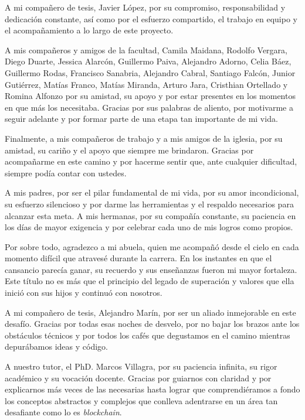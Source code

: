 A mi compañero de tesis, Javier López, por su compromiso, responsabilidad y dedicación constante,
así como por el esfuerzo compartido, el trabajo en equipo y el acompañamiento a lo largo de este
proyecto.

A mis compañeros y amigos de la facultad, Camila Maidana, Rodolfo Vergara, Diego Duarte, Jessica
Alarcón, Guillermo Paiva, Alejandro Adorno, Celia Báez, Guillermo Rodas, Francisco Sanabria, Alejandro Cabral,
Santiago Falcón, Junior Gutiérrez, Matías Franco, Matías Miranda, Arturo Jara, Cristhian Ortellado y
Romina Alfonzo por su amistad, su apoyo y por estar presentes en los momentos en que más los necesitaba.
Gracias por sus palabras de aliento, por motivarme a seguir adelante y por formar parte de una etapa tan importante de mi vida.

Finalmente, a mis compañeros de trabajo y a mis amigos de la iglesia, por su amistad, su cariño y
el apoyo que siempre me brindaron. Gracias por acompañarme en este camino y por hacerme sentir
que, ante cualquier dificultad, siempre podía contar con ustedes.

\vspace{0.3cm}


\clearpage

\vspace*{1cm}

A mis padres, por ser el pilar fundamental de mi vida, por su amor incondicional, su esfuerzo
silencioso y por darme las herramientas y el respaldo necesarios para alcanzar esta meta. A mis
hermanas, por su compañía constante, su paciencia en los días de mayor exigencia y por celebrar
cada uno de mis logros como propios.

Por sobre todo, agradezco a mi abuela, quien me acompañó desde el cielo en cada momento
difícil que atravesé durante la carrera. En los instantes en que el cansancio parecía ganar, su
recuerdo y sus enseñanzas fueron mi mayor fortaleza. Este título no es más que el principio del
legado de superación y valores que ella inició con sus hijos y continuó con nosotros.

A mi compañero de tesis, Alejandro Marín, por ser un aliado inmejorable en este desafío. Gracias
por todas esas noches de desvelo, por no bajar los brazos ante los obstáculos técnicos y por todos
los cafés que degustamos en el camino mientras depurábamos ideas y código.

A nuestro tutor, el PhD. Marcos Villagra, por su paciencia infinita, su rigor académico y su
vocación docente. Gracias por guiarnos con claridad y por explicarnos más veces de las necesarias
hasta lograr que comprendiéramos a fondo los conceptos abstractos y complejos que conlleva
adentrarse en un área tan desafiante como lo es \textit{blockchain}.

